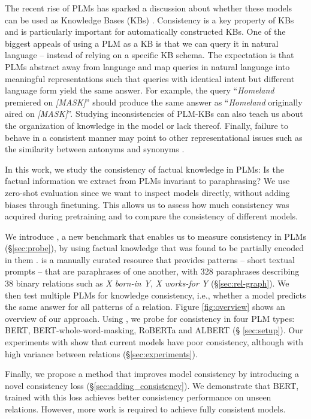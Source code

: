 The recent rise of PLMs has sparked a discussion about whether these models can be used as Knowledge Bases (KBs) \cite{lama,petroni2020how,alpaqa,roberts2020much}. 
Consistency is a key property of KBs and is particularly important for automatically constructed KBs. %
One of the biggest appeals of using a PLM as a KB is that we can
query it in natural language -- instead of relying on a specific KB schema.
The expectation is that PLMs abstract away from language and map queries in natural language into meaningful representations such that queries with identical intent but different language form yield the same answer. 
For example, the query ``\textit{Homeland} premiered on \textit{[MASK]}'' should produce the same answer as ``\textit{Homeland} originally aired on \textit{[MASK]}''.
Studying inconsistencies of PLM-KBs can also teach us about the organization of knowledge in the model or lack thereof. 
Finally, failure to behave in a consistent manner may point
to other representational issues
such as the similarity between antonyms and synonyms
\cite{nguyen2016integrating}.


In this work, we study the consistency of factual knowledge
in PLMs: Is the factual information we extract from PLMs
invariant to paraphrasing? We use zero-shot evaluation since
we want to inspect models directly, without adding biases
through finetuning. This allows us to assess how
much consistency was acquired during pretraining and to
compare the consistency of different models.



We introduce \resource{}, a new benchmark that enables us to measure consistency in PLMs (\S \ref{sec:probe}), by using factual knowledge that was found to be partially encoded in them \cite{lama,alpaqa}.
\resource{} is a manually curated resource
that provides patterns -- short textual prompts -- that are paraphrases of one another, with 328 paraphrases describing 38 binary relations such as \textit{X born-in Y}, \textit{X works-for Y} (\S \ref{sec:rel-graph}).
We then test multiple PLMs for knowledge consistency, i.e., whether
a model  predicts the same answer for all patterns of a relation.
Figure \ref{fig:overview} shows an overview of our approach.
Using \resource{}, we probe for consistency in four PLM
types: BERT, BERT-whole-word-masking, RoBERTa and ALBERT (\S
\ref{sec:setup}).
Our experiments with \resource{} show that
current models have poor consistency, although with high variance between relations (\S \ref{sec:experiments}). 

Finally, we propose a method that improves model consistency
by introducing a novel consistency loss
(\S \ref{sec:adding_consistency}). We demonstrate that BERT, trained with this loss achieves better consistency performance on unseen relations. However, more work is required to achieve fully consistent models.

